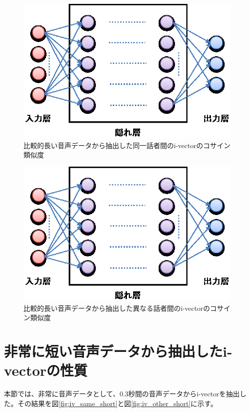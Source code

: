 \begin{figure}[htb]
  \begin{center}
    \includegraphics{../../image/image_dnn.eps}
  \end{center}
  \caption{比較的長い音声データから抽出した同一話者間のi-vectorのコサイン類似度}
  \label{fig:iv_same_long}
\end{figure}

\begin{figure}[htb]
  \begin{center}
    \includegraphics{../../image/image_dnn.eps}
  \end{center}
  \caption{比較的長い音声データから抽出した異なる話者間のi-vectorのコサイン類似度}
  \label{fig:iv_other_long}
\end{figure}

\section{非常に短い音声データから抽出したi-vectorの性質}
本節では、非常に音声データとして、0.3秒間の音声データからi-vectorを抽出した。その結果を図\ref{fig:iv_same_short}と図\ref{fig:iv_other_short}に示す。\par

